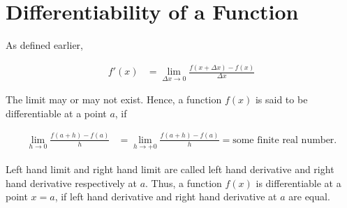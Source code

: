 

\section*{Differentiability of a Function}

As defined earlier,

\begin{align*}
    f'(x) &= \lim_{\Delta x \to 0} \frac{f(x + \Delta x) - f(x)}{\Delta x}
\end{align*}

The limit may or may not exist. Hence, a function \( f(x) \) is said to be differentiable at a point \( a \), if 

\begin{align*}
    \lim_{h \to 0} \frac{f(a + h) - f(a)}{h} &= \lim_{h \to +0} \frac{f(a + h) - f(a)}{h} = \text{some finite real number}.
\end{align*}

Left hand limit and right hand limit are called left hand derivative and right hand derivative respectively at \( a \). Thus, a function \( f(x) \) is differentiable at a point \( x = a \), if left hand derivative and right hand derivative at \( a \) are equal.


